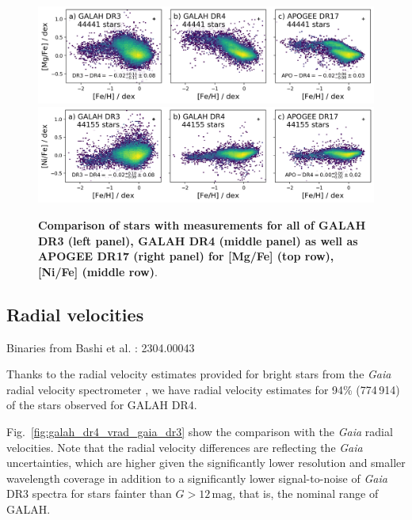 \documentclass[
  journal=pasa,
  manuscript=research-paper, %
  year=2024,
  volume=37
]{cup-journal}
\newcommand{\Gaia}{\textit{Gaia}\xspace}
\begin{document}
\begin{figure}
 \centering
 \includegraphics[width=\textwidth]{figures/comparison_dr4_dr3_apo17_Mg_fe.png}
 \includegraphics[width=\textwidth]{figures/comparison_dr4_dr3_apo17_Ni_fe.png}
 \caption{\textbf{Comparison of stars with measurements for all of GALAH DR3 (left panel), GALAH DR4 (middle panel) as well as APOGEE DR17 (right panel) for [Mg/Fe] (top row), [Ni/Fe] (middle row)}.}
 \label{fig:comparison_dr4_dr3_apo17}
\end{figure}

\subsection{Radial velocities}

Binaries from Bashi et al. : 2304.00043 \citep{Bashi2023}

Thanks to the radial velocity estimates provided for bright stars from the \Gaia radial velocity spectrometer \citep{Katz2022}, we have radial velocity estimates for 94\% (774\,914) of the stars observed for GALAH DR4.

Fig.~\ref{fig:galah_dr4_vrad_gaia_dr3} show the comparison with the \Gaia radial velocities. Note that the radial velocity differences are reflecting the \Gaia uncertainties, which are higher given the significantly lower resolution and smaller wavelength coverage in addition to a significantly lower signal-to-noise of \Gaia DR3 spectra for stars fainter than $G > 12\,\mathrm{mag}$, that is, the nominal range of GALAH.
\end{document}
